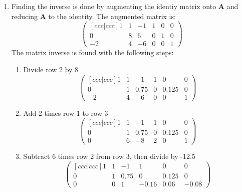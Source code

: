 \begin{enumerate}
\item Finding the inverse is done by augmenting the identiy matrix onto $\boldsymbol{A}$ and reducing $\boldsymbol{A}$ to the identity. The augmented matrix is:
\begin{equation*}
\begin{pmatrix}[ccc|ccc]
	1&1&-1&1&0&0\\0&8&6&0&1&0\\-2&4&-6&0&0&1
\end{pmatrix}
\end{equation*}
The matrix inverse is found with the following steps:
\begin{enumerate}
	\item Divide row 2 by 8
	\begin{equation*}
		\begin{pmatrix}[ccc|ccc]
			1&1&-1&1&0&0\\0&1&0.75&0&0.125&0\\-2&4&-6&0&0&1
		\end{pmatrix}
	\end{equation*}
	\item Add 2 times row 1 to row 3
	\begin{equation*}
		\begin{pmatrix}[ccc|ccc]
			1&1&-1&1&0&0\\0&1&0.75&0&0.125&0\\0&6&-8&2&0&1
		\end{pmatrix}
	\end{equation*}	
	
	\item Subtract 6 times row 2 from row 3, then divide by -12.5
	\begin{equation*}
		\begin{pmatrix}[ccc|ccc]
			1&1&-1&1&0&0\\0&1&0.75&0&0.125&0\\0&0&1&-0.16&0.06&-0.08
		\end{pmatrix}
	\end{equation*}	


\end{enumerate}
\end{enumerate}
